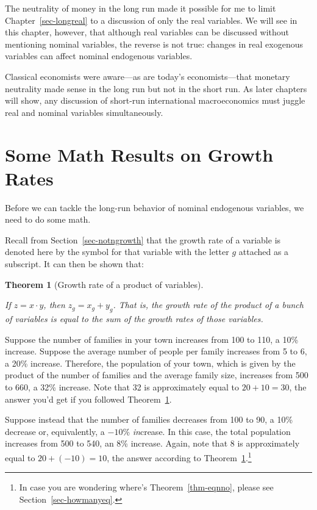 \documentclass[
  letterpaper,
]{book}
\theoremstyle{plain}
\newtheorem{theorem}{Theorem}[chapter]
\theoremstyle{remark}
\begin{document}
The neutrality of money in the long run made it possible for me to limit
Chapter~\ref{sec-longreal} to a discussion of only the real variables.
We will see in this chapter, however, that although real variables can
be discussed without mentioning nominal variables, the reverse is not
true: changes in real exogenous variables can affect nominal endogenous
variables.

Classical economists were aware---as are today's economists---that
monetary neutrality made sense in the long run but not in the short run.
As later chapters will show, any discussion of short-run international
macroeconomics must juggle real and nominal variables simultaneously.

\section{Some Math Results on Growth Rates}\label{sec-lmath}

Before we can tackle the long-run behavior of nominal endogenous
variables, we need to do some math.

Recall from Section~\ref{sec-notngrowth} that the growth rate of a
variable is denoted here by the symbol for that variable with the letter
\(g\) attached as a subscript. It can then be shown that:

\begin{theorem}[Growth rate of a product of
variables]\protect\hypertarget{thm-gprod}{}\label{thm-gprod}

If \(z=x\cdot y\), then \(z_g=x_g+y_g\). That is, the growth rate of the
product of a bunch of variables is equal to the sum of the growth rates
of those variables.

\end{theorem}

Suppose the number of families in your town increases from 100 to 110, a
10\% increase. Suppose the average number of people per family increases
from 5 to 6, a 20\% increase. Therefore, the population of your town,
which is given by the product of the number of families and the average
family size, increases from 500 to 660, a 32\% increase. Note that 32 is
approximately equal to \(20+10=30\), the answer you'd get if you
followed Theorem~\ref{thm-gprod}.

Suppose instead that the number of families decreases from 100 to 90, a
10\% decrease or, equivalently, a \(-10\)\% \emph{in}crease. In this
case, the total population increases from 500 to 540, an 8\% increase.
Again, note that 8 is approximately equal to \(20+(-10)=10\), the answer
according to Theorem~\ref{thm-gprod}.\footnote{In case you are wondering
  where's Theorem~\ref{thm-eqnno}, please see
  Section~\ref{sec-howmanyeq}.}
\end{document}
